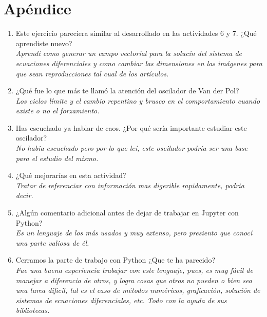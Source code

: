 \documentclass[12pt]{article}
\begin{document}
\section*{Apéndice}
\begin{enumerate}
\item Este ejercicio pareciera similar al desarrollado en las actividades 6 y 7. ¿Qué aprendiste nuevo?\\
\textit{Aprendí como generar un campo vectorial para la solucín del sistema de ecuaciones diferenciales y como cambiar las dimensiones en las imágenes para que sean reproducciones tal cual de los artículos.}
\item ¿Qué fue lo que más te llamó la atención del oscilador de Van der Pol?\\
\textit{Los ciclos límite y el cambio repentino y brusco en el comportamiento cuando existe o no el forzamiento.}
\item Has escuchado ya hablar de caos. ¿Por qué sería importante estudiar este oscilador?\\
\textit{No habia escuchado pero por lo que leí, este oscilador podría ser una base para el estudio del mismo.}
\item ¿Qué mejorarías en esta actividad?\\
\textit{Tratar de referenciar con información mas digerible rapidamente, podria decir.}
\item ¿Algún comentario adicional antes de dejar de trabajar en Jupyter con Python?\\
\textit{Es un lenguaje de los más usados y muy extenso, pero presiento que conocí una parte valiosa de él.}
\item Cerramos la parte de trabajo con Python ¿Que te ha parecido?\\
\textit{Fue una buena experiencia trabajar con este lenguaje, pues, es muy fácil de manejar a diferencia de otros, y logra cosas que otros no pueden o bien sea una tarea dificil, tal es el caso de métodos numéricos, graficación, solución de sistemas de ecuaciones diferenciales, etc. Todo con la ayuda de sus bibliotecas.}
\end{enumerate}
\end{document}
